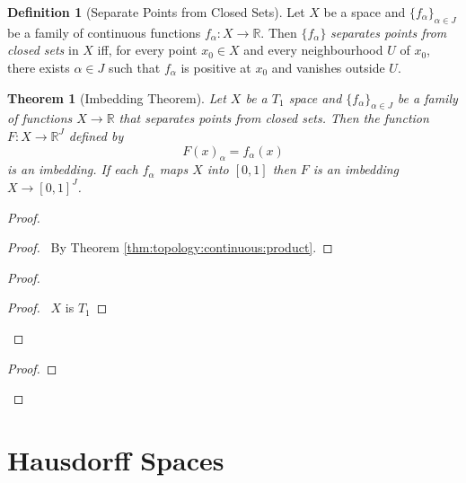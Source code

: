 \documentclass{report}
\let\qed\relax
\newtheorem{thm}[lm]{Theorem}
\theoremstyle{definition}
\newtheorem{df}[lm]{Definition}
\newcommand{\inv}[1]{\ensuremath{{#1}^{-1}}}
\begin{document}
    \begin{df}[Separate Points from Closed Sets]
    Let $X$ be a space and $\{ f_\alpha \}_{\alpha \in J}$ be a family of
     continuous functions $f_\alpha : X \rightarrow \mathbb{R}$. Then $\{
     f_\alpha \}$ \emph{separates points from closed sets} in $X$ iff, for
every point $x_0 \in X$ and every neighbourhood $U$ of $x_0$, there exists
$\alpha \in J$ such that $f_\alpha$ is positive at $x_0$ and vanishes outside
$U$.
 \end{df}

   \begin{thm}[Imbedding Theorem]
   Let $X$ be a $T_1$ space and $\{ f_\alpha \}_{\alpha \in J}$ be a family of
   functions $X \rightarrow \mathbb{R}$ that separates points from closed sets.
   Then the function $F : X \rightarrow \mathbb{R}^J$ defined by
   \[ F(x)_\alpha = f_\alpha(x) \]
   is an imbedding. If each $f_\alpha$ maps $X$ into $[0,1]$ then $F$ is an
   imbedding $X \rightarrow [0,1]^J$.
 \end{thm}

 \begin{proof}
  \pf
  \begin{proof}
    \pf\ By Theorem \ref{thm:topology:continuous:product}.
  \end{proof}
  \begin{proof}
    \begin{proof}
      \pf\ $X$ is $T_1$
    \end{proof}
  \end{proof}
  \begin{proof}
    \step{<2>5}{$z \in \inv{\pi_\alpha}((0, +\infty)) \cap F(U) \subseteq F(U)$}
  \end{proof}
  \qed
 \end{proof}


  \section{Hausdorff Spaces}
\end{document}
